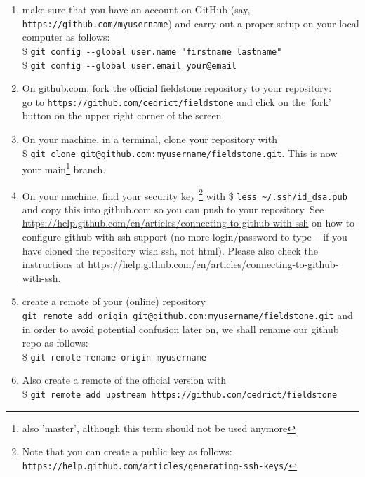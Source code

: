 \begin{enumerate}
\item make sure that you  have an account on GitHub (say, \verb"https://github.com/myusername") 
and carry out a proper setup on your local computer as follows:\\
\$ \verb'git config --global user.name "firstname lastname" '\\
\$ \verb'git config --global user.email your@email'

\item On github.com, fork the official fieldstone 
repository to your repository:\\
go to \verb"https://github.com/cedrict/fieldstone" 
and click on the 'fork' button on the upper right corner of the screen.
\item On your machine, in a terminal, clone your repository with \\
\$ \verb"git clone git@github.com:myusername/fieldstone.git". This is now your main\footnote{also 'master', although this term should not be used anymore} branch.

\item On your machine, find your security key \footnote{
Note that you can create a public key as follows: 
{\tt https://help.github.com/articles/generating-ssh-keys/}}
 with \$ \verb"less ~/.ssh/id_dsa.pub" and copy this into github.com 
so you can push to your repository. See \url{https://help.github.com/en/articles/connecting-to-github-with-ssh} on how to configure github with ssh support (no more login/password to type -- if you have cloned the repository wish ssh, not html).
Please also check the instructions at \url{https://help.github.com/en/articles/connecting-to-github-with-ssh}.  
 
\item create a remote of your (online) repository\\
\verb"git remote add origin git@github.com:myusername/fieldstone.git"
and in order to avoid potential confusion later on, we shall rename our github repo as follows:\\
\$ \verb"git remote rename origin myusername" 

\item Also create a remote of the official version with\\
\$ \verb"git remote add upstream https://github.com/cedrict/fieldstone"

\end{enumerate}


